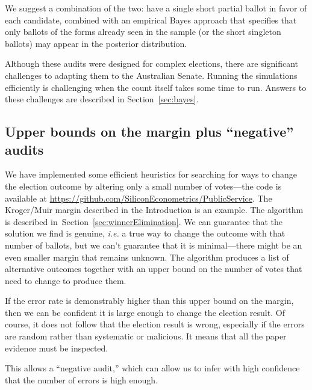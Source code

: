 \documentclass[10pt,a4paper]{article}
\newcommand{\shortVersion}[1]{}
\newcommand{\longVersion}[1]{#1}
\newcommand{\shortVersion}[1]{#1}
\newcommand{\longVersion}[1]{}
\begin{document}
We suggest a combination of the two: have a single short partial ballot in
favor of each candidate, combined with an empirical Bayes approach that
specifies that only ballots of the forms already seen in the sample
(or the short singleton ballots) may appear in the posterior distribution.

Although these audits were designed for complex elections, there are
significant challenges to adapting them to the Australian Senate.  
Running the simulations efficiently is challenging when the count itself takes
some time to run.  Answers to these challenges are described in
\shortVersion{the full version of the paper.}\longVersion{Section~\ref{sec:bayes}.}

\subsection{Upper bounds on the margin plus ``negative'' audits}  \label{subsec:upperBounds}
We have implemented some efficient heuristics for searching for ways to change the election outcome by altering only a small number of votes---the code is available at \url{https://github.com/SiliconEconometrics/PublicService}.  The Kroger/Muir margin described in the Introduction is an example.   \longVersion{The algorithm is described in~Section~\ref{sec:winnerElimination}.} 
We can guarantee that the solution we find is genuine, {\it i.e.} a true way to change the outcome with that number of ballots, but we can't guarantee that it is minimal---there might be an even smaller margin that remains unknown.  The algorithm produces a list of alternative outcomes together with an upper bound on the number of votes that need to change to produce them.

If the error rate is demonstrably higher than this upper bound on the margin, then we can be confident it is large enough to change the election result. Of course, it does not follow that the election result is wrong, especially if the errors are random rather than systematic or malicious.  It means that all the paper evidence must be inspected.  

This allows a ``negative audit,'' which can allow us to infer with high confidence that the number of errors is high enough.   
\end{document}
